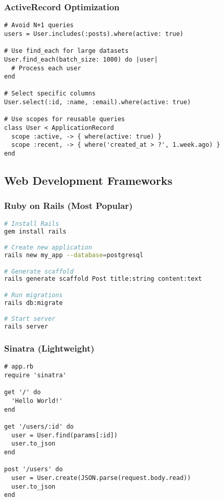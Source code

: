 \documentclass[12pt,a4paper]{article}
\begin{document}
\subsubsection{ActiveRecord Optimization}

\begin{lstlisting}
# Avoid N+1 queries
users = User.includes(:posts).where(active: true)

# Use find_each for large datasets
User.find_each(batch_size: 1000) do |user|
  # Process each user
end

# Select specific columns
User.select(:id, :name, :email).where(active: true)

# Use scopes for reusable queries
class User < ApplicationRecord
  scope :active, -> { where(active: true) }
  scope :recent, -> { where('created_at > ?', 1.week.ago) }
end
\end{lstlisting}

\subsection{Web Development Frameworks}

\subsubsection{Ruby on Rails (Most Popular)}

\begin{lstlisting}[language=bash]
# Install Rails
gem install rails

# Create new application
rails new my_app --database=postgresql

# Generate scaffold
rails generate scaffold Post title:string content:text

# Run migrations
rails db:migrate

# Start server
rails server
\end{lstlisting}

\subsubsection{Sinatra (Lightweight)}

\begin{lstlisting}
# app.rb
require 'sinatra'

get '/' do
  'Hello World!'
end

get '/users/:id' do
  user = User.find(params[:id])
  user.to_json
end

post '/users' do
  user = User.create(JSON.parse(request.body.read))
  user.to_json
end
\end{lstlisting}
\end{document}
